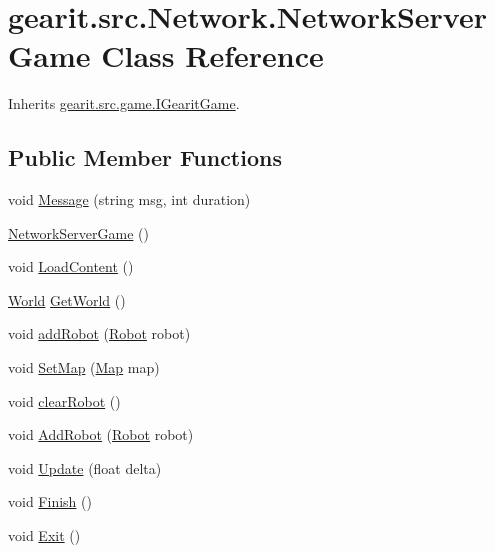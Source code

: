 \hypertarget{classgearit_1_1src_1_1_network_1_1_network_server_game}{\section{gearit.\+src.\+Network.\+Network\+Server\+Game Class Reference}
\label{classgearit_1_1src_1_1_network_1_1_network_server_game}
}


Inherits \hyperlink{interfacegearit_1_1src_1_1game_1_1_i_gearit_game}{gearit.\+src.\+game.\+I\+Gearit\+Game}.

\subsection*{Public Member Functions}
\begin{DoxyCompactItemize}
\item 
void \hyperlink{classgearit_1_1src_1_1_network_1_1_network_server_game_a7b9fbbea65c50c0c91d36c5d2047c00d}{Message} (string msg, int duration)
\item 
\hyperlink{classgearit_1_1src_1_1_network_1_1_network_server_game_ae872be804fd061e8baa9ebd56bae7523}{Network\+Server\+Game} ()
\item 
void \hyperlink{classgearit_1_1src_1_1_network_1_1_network_server_game_a5bcf03626dd9b0d38778a2331178e856}{Load\+Content} ()
\item 
\hyperlink{class_farseer_physics_1_1_dynamics_1_1_world}{World} \hyperlink{classgearit_1_1src_1_1_network_1_1_network_server_game_aad6f29484d1dffc5d7725c9d92cff2a0}{Get\+World} ()
\item 
void \hyperlink{classgearit_1_1src_1_1_network_1_1_network_server_game_a98d38a328eb944e3d3ab6c6c00198283}{add\+Robot} (\hyperlink{classgearit_1_1src_1_1robot_1_1_robot}{Robot} robot)
\item 
void \hyperlink{classgearit_1_1src_1_1_network_1_1_network_server_game_a9c5574e4b139d58e24188d58700d9107}{Set\+Map} (\hyperlink{classgearit_1_1src_1_1map_1_1_map}{Map} map)
\item 
void \hyperlink{classgearit_1_1src_1_1_network_1_1_network_server_game_a490afeccf8aabc8ca8e3d2a30b517741}{clear\+Robot} ()
\item 
void \hyperlink{classgearit_1_1src_1_1_network_1_1_network_server_game_a02b8f50022b923592f4d80844b7c1be1}{Add\+Robot} (\hyperlink{classgearit_1_1src_1_1robot_1_1_robot}{Robot} robot)
\item 
void \hyperlink{classgearit_1_1src_1_1_network_1_1_network_server_game_a6e3f1dfd4e7356b7b1a934c0726eca78}{Update} (float delta)
\item 
void \hyperlink{classgearit_1_1src_1_1_network_1_1_network_server_game_a08d55ede8967e6b115dc7fcb788ebd18}{Finish} ()
\item 
void \hyperlink{classgearit_1_1src_1_1_network_1_1_network_server_game_aafa57969ed5133c12f0c4a778742095e}{Exit} ()
\end{DoxyCompactItemize}
